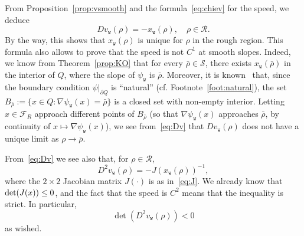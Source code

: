 \documentclass[10pt]{amsart}
\theoremstyle{definition}\newtheorem{defi}[theo]{Definition}\newtheorem{rema}[theo]{Remark}\newtheorem{exam}[theo]{Example}\newtheorem{exem}[theo]{Example}\newtheorem{nota}[theo]{Notation}
\newcommand{\psiw}{\psi_{\mathtt w}}
\newcommand{\ttw}{\mathtt{w}}
\newcommand{\clS}{\mathcal{S}}
\newcommand{\clR}{\mathcal{R}}
\newcommand{\clF}{\mathcal{F}}
\begin{document}
From Proposition~\ref{prop:vsmooth} and the formula~\eqref{eq:chiev} for the speed, we deduce
\begin{equation}\label{eq:Dv}
D v_{\ttw}(\rho)=-x_{\ttw}(\rho), \quad \rho\in\clR.
\end{equation}
By the way, this shows that $x_{\ttw}(\rho)$ is unique for $\rho$ in the rough region. This formula also allows to prove that the speed is not $C^1$ at smooth slopes. Indeed, we know from Theorem~\ref{prop:KO} that for every $\bar\rho\in \clS$, there exists $x_{\ttw}(\bar\rho)$ in the interior of $Q$, where the slope of $\psiw$ is $\bar\rho$. Moreover, it is known~\cite{Duse} that, since the boundary condition $\psi|_{\partial Q}$ is ``natural'' (cf. Footnote~\ref{foot:natural}), the set $B_{\bar \rho}:=\{x\in Q: \nabla\psiw(x)=\bar \rho\}$ is a closed set with non-empty interior. Letting $x\in \clF_R$ approach different points of $B_{\bar\rho}$ (so that $\nabla\psiw(x)$ approaches $\bar\rho$, by continuity of $x\mapsto \nabla\psiw(x)$), we see from~\eqref{eq:Dv} that $D v_{\ttw}(\rho)$ does not have a unique limit as $\rho\to\bar \rho$.

From~\eqref{eq:Dv} we see also that, for $\rho\in \clR$,
\begin{equation}\label{eq:implicit}
D^2 v_{\ttw}(\rho) = - J(x_{\ttw}(\rho))^{-1},
\end{equation}
where the $2\times 2$ Jacobian matrix $J(\cdot)$ is as in~\eqref{eq:J}. We already know that $\det(J(x))\linebreak\le0$, and the fact that the speed is $C^2$ means that the inequality is strict. In particular,
\begin{equation}
\det\left(D^2 v_{\ttw}(\rho)\right)<0
\end{equation}
as wished.
\end{document}
